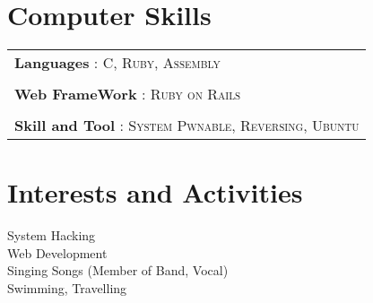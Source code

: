 \documentclass[a4paper,10pt]{article}
\begin{document}
\section{Computer Skills}
\begin{tabular}{l}
    \textbf{Languages} :   \textsc{C}, \textsc{Ruby}, \textsc{Assembly} \\\\
    \textbf{Web FrameWork} :   \textsc{Ruby on Rails}\\\\
    \textbf{Skill and Tool} : \textsc{System Pwnable}, \textsc{Reversing}, \textsc{Ubuntu}\\
\end{tabular}

\section{Interests and Activities}
System Hacking\\
Web Development\\
Singing Songs (Member of Band, Vocal)\\
Swimming, Travelling


\end{document}
